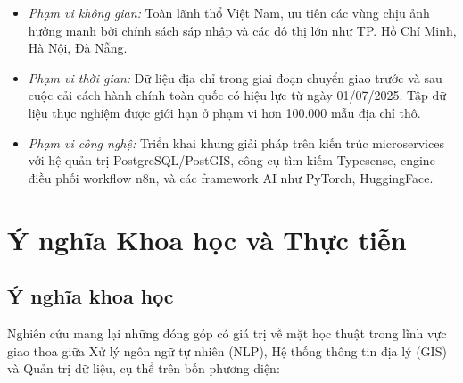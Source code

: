 \begin{itemize}
    \item \textit{Phạm vi không gian:} Toàn lãnh thổ Việt Nam, ưu tiên các vùng chịu ảnh hưởng mạnh bởi chính sách sáp nhập và các đô thị lớn như TP. Hồ Chí Minh, Hà Nội, Đà Nẵng.
    \item \textit{Phạm vi thời gian:} Dữ liệu địa chỉ trong giai đoạn chuyển giao trước và sau cuộc cải cách hành chính toàn quốc có hiệu lực từ ngày 01/07/2025. Tập dữ liệu thực nghiệm được giới hạn ở phạm vi hơn 100.000 mẫu địa chỉ thô.
    \item \textit{Phạm vi công nghệ:} Triển khai khung giải pháp trên kiến trúc microservices với hệ quản trị PostgreSQL/PostGIS, công cụ tìm kiếm Typesense, engine điều phối workflow n8n, và các framework AI như PyTorch, HuggingFace.
\end{itemize}

\section{Ý nghĩa Khoa học và Thực tiễn}
\label{sec:significance}
\subsection{Ý nghĩa khoa học}

Nghiên cứu mang lại những đóng góp có giá trị về mặt học thuật trong lĩnh vực giao thoa giữa Xử lý ngôn ngữ tự nhiên (NLP), Hệ thống thông tin địa lý (GIS) và Quản trị dữ liệu, cụ thể trên bốn phương diện:

